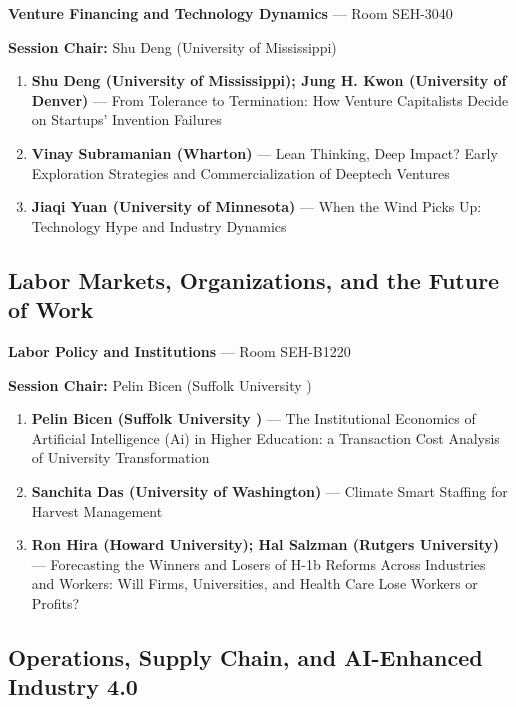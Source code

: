 \documentclass[
  10pt,
  letterpaper,
  DIV=11,
  numbers=noendperiod]{scrartcl}
\begin{document}
\textbf{Venture Financing and Technology Dynamics} --- Room SEH-3040

\textbf{Session Chair:} Shu Deng (University of Mississippi)

\begin{enumerate}
\def\labelenumi{\arabic{enumi}.}
\item
  \textbf{Shu Deng (University of Mississippi); Jung H. Kwon (University
  of Denver)} --- From Tolerance to Termination: How Venture Capitalists
  Decide on Startups' Invention Failures
\item
  \textbf{Vinay Subramanian (Wharton)} --- Lean Thinking, Deep Impact?
  Early Exploration Strategies and Commercialization of Deeptech
  Ventures
\item
  \textbf{Jiaqi Yuan (University of Minnesota)} --- When the Wind Picks
  Up: Technology Hype and Industry Dynamics
\end{enumerate}

\subsection{\texorpdfstring{\textcolor{labor}{Labor Markets, Organizations, and the Future of Work}}{}}\label{section-10}

\textbf{Labor Policy and Institutions} --- Room SEH-B1220

\textbf{Session Chair:} Pelin Bicen (Suffolk University )

\begin{enumerate}
\def\labelenumi{\arabic{enumi}.}
\item
  \textbf{Pelin Bicen (Suffolk University )} --- The Institutional
  Economics of Artificial Intelligence (Ai) in Higher Education: a
  Transaction Cost Analysis of University Transformation
\item
  \textbf{Sanchita Das (University of Washington)} --- Climate Smart
  Staffing for Harvest Management
\item
  \textbf{Ron Hira (Howard University); Hal Salzman (Rutgers
  University)} --- Forecasting the Winners and Losers of H-1b Reforms
  Across Industries and Workers: Will Firms, Universities, and Health
  Care Lose Workers or Profits?
\end{enumerate}

\subsection{\texorpdfstring{\textcolor{operations}{Operations, Supply Chain, and AI-Enhanced Industry 4.0}}{}}\label{section-11}
\end{document}
